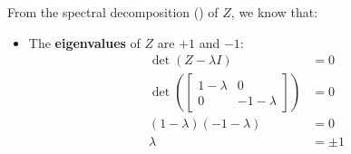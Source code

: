 \highspace
From the spectral decomposition () of $Z$, we know that:
\begin{itemize}
    \item The \textbf{eigenvalues} of $Z$ are $+1$ and $-1$:
    \begin{align*}
        \det\left(Z - \lambda I\right) &= 0 \\
        \det\left(\begin{bmatrix}
            1 - \lambda & 0 \\
            0 & -1 - \lambda
        \end{bmatrix}\right) &= 0 \\
        (1 - \lambda)(-1 - \lambda) &= 0 \\
        \lambda &= \pm 1
    \end{align*}
    

\end{itemize}
